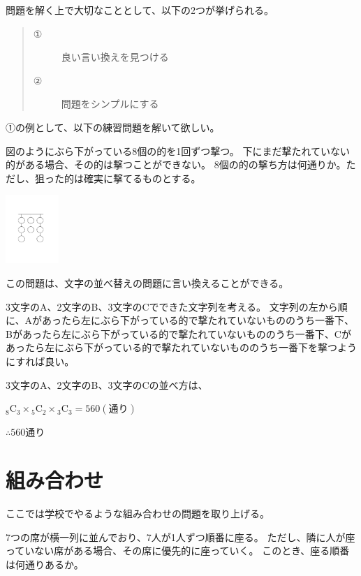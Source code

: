 \documentclass[uplatex,dvipdfmx]{jsbook}
\begin{document}
問題を解く上で大切なこととして、以下の2つが挙げられる。
\begin{quote}
    \begin{description}
        \item[①]良い言い換えを見つける
        \item[②]問題をシンプルにする
    \end{description}
\end{quote}

①の例として、以下の練習問題を解いて欲しい。

\begin{problem}[練習問題]
    図のようにぶら下がっている8個の的を1回ずつ撃つ。
    下にまだ撃たれていない的がある場合、その的は撃つことができない。
    8個の的の撃ち方は何通りか。ただし、狙った的は確実に撃てるものとする。

    \includegraphics[clip,width=2cm]{figures/c_practice1.pdf}
\end{problem}

\begin{answer}
    この問題は、文字の並べ替えの問題に言い換えることができる。

    3文字のA、2文字のB、3文字のCでできた文字列を考える。
    文字列の左から順に、Aがあったら左にぶら下がっている的で撃たれていないもののうち一番下、Bがあったら左にぶら下がっている的で撃たれていないもののうち一番下、Cがあったら左にぶら下がっている的で撃たれていないもののうち一番下を撃つようにすれば良い。

    3文字のA、2文字のB、3文字のCの並べ方は、

    ${}_8\mathrm{C}_3 \times {}_5\mathrm{C}_2 \times {}_3\mathrm{C}_3
    =560(\text{通り})$

    $\therefore 560$通り
\end{answer}

\section{組み合わせ}
ここでは学校でやるような組み合わせの問題を取り上げる。
\begin{problem}[練習問題1]
    7つの席が横一列に並んでおり、7人が1人ずつ順番に座る。
    ただし、隣に人が座っていない席がある場合、その席に優先的に座っていく。
    このとき、座る順番は何通りあるか。
\end{problem}
\end{document}
